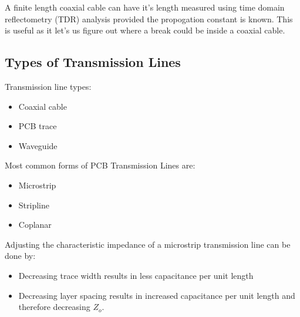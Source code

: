 \documentclass[main.tex]{subfiles}
\begin{document}
A finite length coaxial cable can have it's length measured using time domain reflectometry (TDR) analysis provided the propogation constant is known. This is useful as it let's us figure out where a break could be inside a coaxial cable. 


\subsection{Types of Transmission Lines}
Transmission line types:
\begin{itemize}
    \item Coaxial cable
    \item PCB trace
    \item Waveguide
\end{itemize}
Most common forms of PCB Transmission Lines are:
\begin{itemize}
    \item Microstrip
    \item Stripline
    \item Coplanar
\end{itemize}
Adjusting the characteristic impedance of a microstrip transmission line can be done by:
\begin{itemize}
    \item Decreasing trace width results in less capacitance per unit length 
    \item Decreasing layer spacing results in increased capacitance per unit length and therefore decreasing $Z_o$.
\end{itemize}
\end{document}
